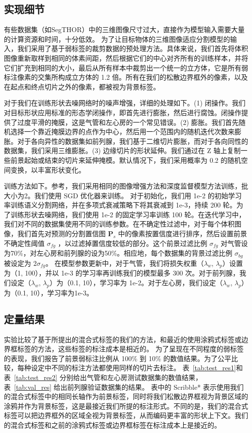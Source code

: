 \subsection{实现细节} \label{sec:detail}

有些数据集（如SegTHOR）中的三维图像尺寸过大，直接作为模型输入需要大量的计算资源和时间，十分低效。
为了让目标物体的三维图像适应分割模型的输入，我们采用了基于弱标签的裁剪数据的预处理方法。具体来说，我们首先将体积图像重新取样到相同的体素间距，然后根据它们的中心对齐所有的训练样本，并将它们扩充到相同的大小，最后从所有样本中裁剪出一个统一的立方体，它是所有弱标注像素的交集所构成立方体的 1.2 倍。所有在我们的松散边界框外的像素，以及在起点和终点切片之外的像素，都被视为背景标签。

对于我们在训练形状去噪网络时的噪声增强，详细的处理如下。(1) 闭操作。我们对目标形状应用标准的形态学闭操作，即首先进行膨胀，然后进行腐蚀。闭操作提供了过度平滑的掩膜，这是气管和左心房的一个常见错误。(2) 膨胀。我们首先随机选择一个靠近掩膜边界的点作为中心，然后用一个范围内的随机迭代次数来膨胀。对于各向异性的数据集如前列腺，我们基于二维切片膨胀，而对于各向同性的数据集，我们采用三维膨胀。(3) 边缘切片的形状延伸。我们通过在 Z 轴上复制一些前景起始或结束的切片来延伸掩模。默认情况下，我们采用概率为 0.2 的随机空间变换，以丰富形状变化。

训练方法如下。参考\citet{isensee2019automated}，我们采用相同的图像增强方法和深度监督模型方法训练，批大小为2。我们使用 SGD 优化器来训练。
对于初始化，我们用 1e-2 的初始学习率训练语义分割网络，并在多项式衰减策略下将其衰减到 1e-3，持续 200 轮。为了训练形状去噪网络，我们使用 1e-2 的固定学习率训练 100 轮。在迭代学习中，我们对不同的数据集使用不同的训练参数。在不确定性过滤中，对于每个体积图像，我们首先对预测的分割置信图 $\mathbf{P}_s$ 中的像素按置信度进行排序，然后设置前景不确定性阈值 $\sigma_{fg}$ ，以过滤掉置信度较低的部分。这个前景过滤比例 $\sigma_{fg}$ 对气管设为70\%，对左心房和前列腺的设为50\%。相应地，每个数据集的背景过滤比例 $\sigma_{bg}$ 被设定为  $2\sigma_{fg}$。
在模型参数更新中，对于气管，我们将损失权重（$\lambda_w$, $\lambda_p$）设置为（1, 100），并以 1e-3 的学习率再训练我们的模型最多 300 次。对于前列腺，我们设定（$\lambda_w$, $\lambda_p$）为（0.1, 10），学习率为 1e-2。对于左心房，我们设定（$\lambda_w$, $\lambda_p$）为（0.1, 10），学习率为1e-3。


\subsection{定量结果} \label{sec:res1}

实验比较了基于所提出的混合式标签的我们的方法，和最近的使用涂鸦式标签或边界框标签的方法，这些标签的标注成本是相近的。
为了呈现在不同程度的弱标签的表现，我们报告了前景弱标注比例从 100\% 到 10\% 的数值结果。为了公平比较，每种设定中不同的标注方法都使用同样的切片去标注。
表~\ref{tab:test_res1}和表~\ref{tab:test_res2} 分别给出气管和左心房测试数据集的数值结果，表~\ref{tab:val_res} 给出前列腺验证数据集的结果。
表中的 Scribble* 表示使用我们的混合式标签中的相同长轴作为前景标签，同时将我们松散边界框视为背景区域的涂鸦并作为背景标签，这是最接近我们所提的标注形式。不同的是，我们的混合式标签可以把边界框外的区域全视为背景标签，从而编码更丰富的形状上下文。我们的混合式标签和之前的涂鸦式标签或边界框标签在标注成本上是接近的。


